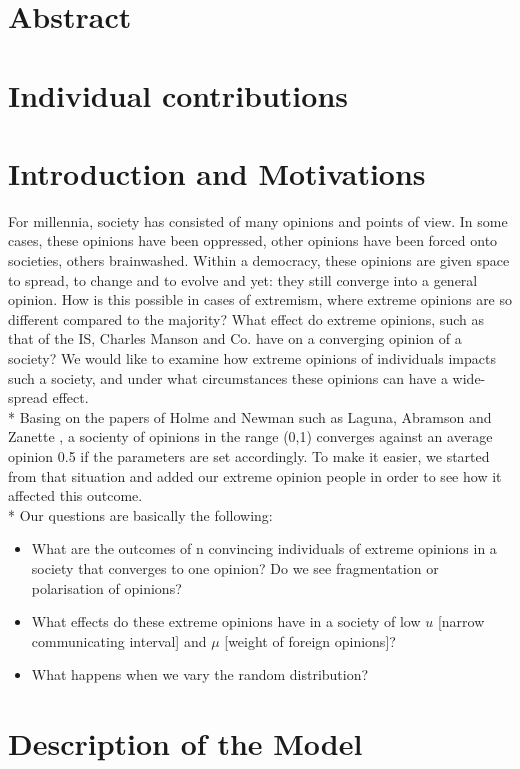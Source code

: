 \documentclass[11pt]{article}
\begin{document}
\section{Abstract}

\section{Individual contributions}

\section{Introduction and Motivations}
For millennia, society has consisted of many opinions and points of view. In some cases, these opinions have been oppressed, other opinions have been forced onto societies, others brainwashed. Within a democracy, these opinions are given space to spread, to change and to evolve and yet: they still converge into a general opinion. How is this possible in cases of extremism, where extreme opinions are so different compared to the majority? What effect do extreme opinions, such as that of the IS, Charles Manson and Co. have on a converging opinion of a society? We would like to examine how extreme opinions of individuals impacts such a society, and under what circumstances these opinions can have a wide-spread effect. \\*
Basing on the papers of Holme and Newman \cite{Coevolutions} such as Laguna, Abramson and Zanette \cite{Minor}, a socienty of opinions in the range (0,1) converges against an average opinion 0.5 if the parameters are set accordingly. To make it easier, we started from that situation and added our extreme opinion people in order to see how it affected this outcome. \\*
Our questions are basically the following: 
\begin{itemize}
\item What are the outcomes of n convincing individuals of extreme opinions in a society that converges to one opinion? Do we see fragmentation or polarisation of opinions?
\item What effects do these extreme opinions have in a society of low $u$ [narrow communicating interval] and $\mu$ [weight of foreign opinions]?
\item What happens when we vary the random distribution?
\end{itemize}

\section{Description of the Model}
\end{document}
